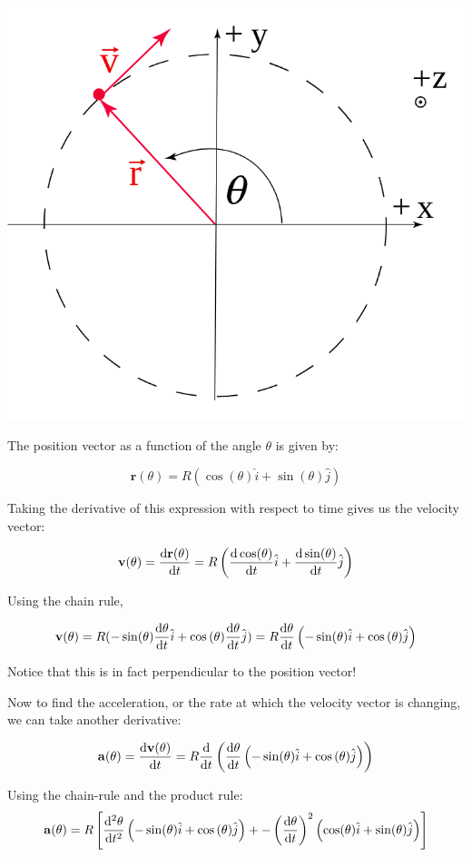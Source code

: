 \documentclass{report}
\begin{document}
\includegraphics[scale=0.3]{circular_motion.png}


The position vector as a function of the angle $\theta$ is given by:

$$\mathbf{r}(\theta) = R(\cos(\theta)\hat{i} + \sin(\theta)\hat{j})$$

Taking the derivative of this expression with respect to time gives us the velocity vector:

$$\mathbf{v}(\theta) = \dv{\mathbf{r}(\theta)}{t} = R\left(\dv{\cos(\theta)}{t}\hat{i}+\dv{\sin(\theta)}{t}\hat{j}\right)$$

Using the chain rule,

$$\mathbf{v}(\theta) = R(-\sin(\theta)\dv{\theta}{t}\hat{i}+\cos{(\theta)}\dv{\theta}{t}\hat{j})=R\dv{\theta}{t} \left(-\sin(\theta)\hat{i}+\cos{(\theta)}\hat{j}\right)$$

Notice that this is in fact perpendicular to the position vector!

Now to find the acceleration, or the rate at which the velocity vector is changing, we can take another derivative:

$$\mathbf{a}(\theta) = \dv{\mathbf{v}(\theta)}{t} = R\dv{}{t} \left(\dv{\theta}{t} \left(-\sin(\theta)\hat{i}+\cos{(\theta)}\hat{j}\right)\right)$$

Using the chain-rule and the product rule:
$$\mathbf{a}(\theta) = R\left[\dv[2]{\theta}{t}\left(-\sin(\theta)\hat{i}+\cos{(\theta)}\hat{j}\right) + -\left(\dv{\theta}{t}\right)^2 \left(\cos(\theta)\hat{i} + \sin(\theta)\hat{j} \right)\right]$$
\end{document}
